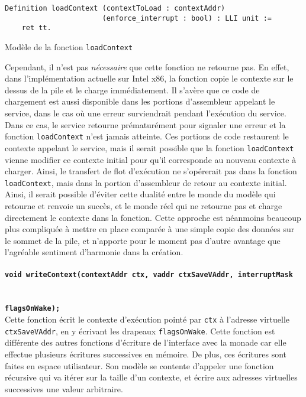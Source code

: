		\begin{listing}[!ht]
			\begin{verbatim}
Definition loadContext (contextToLoad : contextAddr)
                       (enforce_interrupt : bool) : LLI unit :=
    ret tt.
			\end{verbatim}
			\caption{Modèle de la fonction \texttt{loadContext}}
			\label{code:loadContext}
		\end{listing}

		Cependant, il n'est pas \emph{nécessaire} que cette fonction ne retourne pas. En effet, dans l'implémentation actuelle sur Intel x86, la fonction copie le contexte sur le dessus de la pile et le charge immédiatement. Il s'avère que ce code de chargement est aussi disponible dans les portions d'assembleur appelant le service, dans le cas où une erreur surviendrait pendant l'exécution du service. Dans ce cas, le service retourne prématurément pour signaler une erreur et la fonction \texttt{loadContext} n'est jamais atteinte. Ces portions de code restaurent le contexte appelant le service, mais il serait possible que la fonction \texttt{loadContext} vienne modifier ce contexte initial pour qu'il corresponde au nouveau contexte à charger. Ainsi, le transfert de flot d'exécution ne s'opérerait pas dans la fonction \texttt{loadContext}, mais dans la portion d'assembleur de retour au contexte initial. Ainsi, il serait possible d'éviter cette dualité entre le monde du modèle qui retourne et renvoie un succès, et le monde réel qui ne retourne pas et charge directement le contexte dans la fonction. Cette approche est néanmoins beaucoup plus compliquée à mettre en place comparée à une simple copie des données sur le sommet de la pile, et n'apporte pour le moment pas d'autre avantage que l'agréable sentiment d'harmonie dans la création.

		\paragraph{\texttt{void writeContext(contextAddr ctx, vaddr ctxSaveVAddr, interruptMask}}~~\\
		   \textbf{\texttt{flagsOnWake);}}~\\
			Cette fonction écrit le contexte d'exécution pointé par \texttt{ctx} à l'adresse virtuelle \texttt{ctxSaveVAddr}, en y écrivant les drapeaux \texttt{flagsOnWake}. Cette fonction est différente des autres fonctions d'écriture de l'interface avec la monade car elle effectue plusieurs écritures successives en mémoire. De plus, ces écritures sont faites en espace utilisateur. Son modèle se contente d'appeler une fonction récursive qui va itérer sur la taille d'un contexte, et écrire aux adresses virtuelles successives une valeur arbitraire.\\

